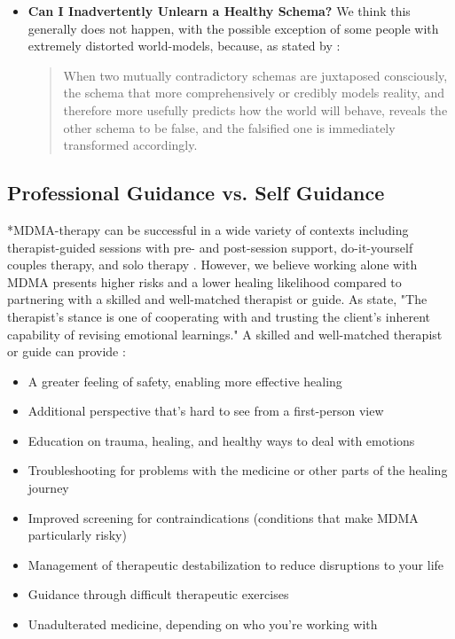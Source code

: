 \documentclass[12pt,letterpaper]{article}
\begin{document}
\begin{itemize}
        \item \textbf{Can I Inadvertently Unlearn a Healthy Schema?}
            We think this generally does not happen, with the possible exception of some people with extremely distorted world-models, because, as stated by \textcite{ecker2015misunderstood}:
            \begin{quotation}
            	When two mutually contradictory schemas are juxtaposed consciously, the schema that more comprehensively or credibly models reality, and therefore more usefully predicts how the world will behave, reveals the other schema to be false, and the falsified  one is immediately transformed accordingly.
            \end{quotation}
\end{itemize}

\subsection{Professional Guidance vs. Self Guidance}
\label{profressionalVSSelf}
*MDMA-therapy can be successful in a wide variety of contexts including therapist-guided sessions with pre- and post-session support, do-it-yourself couples therapy, and solo therapy \cite{mitchellMDMAClinicalTrial2,colbertEvenings,hillsSolo}. However, we believe working alone with MDMA presents higher risks and a lower healing likelihood compared to partnering with a skilled and well-matched therapist or guide. As \textcite{eckerUnlocking} state, "The therapist’s stance is one of cooperating with and trusting the client’s inherent capability of revising emotional learnings." A skilled and well-matched therapist or guide can provide \cite{mithoeferManual}:
\begin{itemize}
    \item A greater feeling of safety, enabling more effective healing
    \item Additional perspective that's hard to see from a first-person view
    \item Education on trauma, healing, and healthy ways to deal with emotions
    \item Troubleshooting for problems with the medicine or other parts of the healing journey
    \item Improved screening for contraindications (conditions that make MDMA particularly risky)
    \item Management of therapeutic destabilization to reduce disruptions to your life
    \item Guidance through difficult therapeutic exercises 
    \item Unadulterated medicine, depending on who you're working with
\end{itemize}
\end{document}
